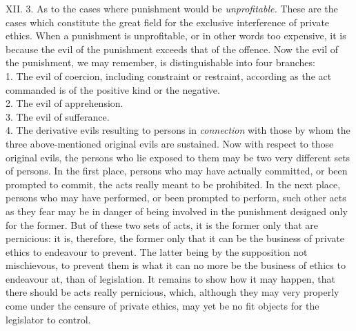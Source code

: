 \documentclass[12pt]{report}
\begin{document}
XII. 3. As to the cases where punishment would be \emph{unprofitable.}
These are the cases which constitute the great field for the exclusive
interference of private ethics. When a punishment is unprofitable, or in
other words too expensive, it is because the evil of the punishment
exceeds that of the offence. Now the evil of the punishment, we may
remember, is distinguishable into four branches:\\
1. The evil of coercion, including constraint or restraint, according as
the act commanded is of the positive kind or the negative.\\
2. The evil of apprehension.\\
3. The evil of sufferance.\\
4. The derivative evils resulting to persons in \emph{connection} with
those by whom the three above-mentioned original evils are sustained.
Now with respect to those original evils, the persons who lie exposed to
them may be two very different sets of persons. In the first place,
persons who may have actually committed, or been prompted to commit, the
acts really meant to be prohibited. In the next place, persons who may
have performed, or been prompted to perform, such other acts as they
fear may be in danger of being involved in the punishment designed only
for the former. But of these two sets of acts, it is the former only
that are pernicious: it is, therefore, the former only that it can be
the business of private ethics to endeavour to prevent. The latter being
by the supposition not mischievous, to prevent them is what it can no
more be the business of ethics to endeavour at, than of legislation. It
remains to show how it may happen, that there should be acts really
pernicious, which, although they may very properly come under the
censure of private ethics, may yet be no fit objects for the legislator
to control.
\end{document}
